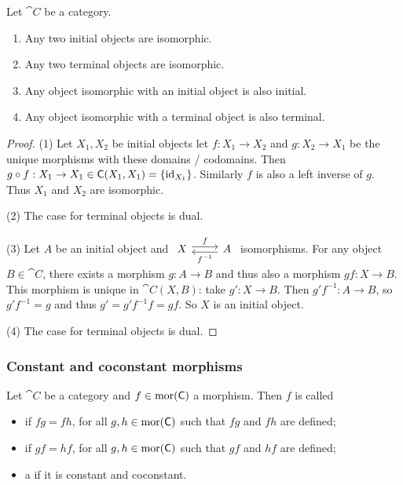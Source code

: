 \begin{proposition} \label{initialTerminalIsomorphisms}
Let $\cat{C}$ be a category.
\begin{enumerate}
\item Any two initial objects are isomorphic.
\item Any two terminal objects are isomorphic.
\item Any object isomorphic with an initial object is also initial.
\item Any object isomorphic with a terminal object is also terminal.
\end{enumerate}
\end{proposition}
\begin{proof}
(1) Let $X_1,X_2$ be initial objects let $f:X_1\to X_2$ and $g:X_2\to X_1$ be the unique morphisms with these domains / codomains. Then $g\circ f: X_1 \to X_1 \in \mathsf{C}(X_1, X_1) = \{\operatorname{id}_{X_1}\}$. Similarly $f$ is also a left inverse of $g$. Thus $X_1$ and $X_2$ are isomorphic.

(2) The case for terminal objects is dual.

(3) Let $A$ be an initial object and $\begin{tikzcd}
X \arrow[r, shift left, "f"] & \arrow[l, shift left, "f^{-1}"] A
\end{tikzcd}$ isomorphisms. For any object $B\in \cat{C}$, there exists a morphism $g: A\to B$ and thus also a morphism $gf: X\to B$. This morphism is unique in $\cat{C}(X, B)$: take $g': X\to B$. Then $g'f^{-1}: A\to B$, so $g'f^{-1} = g$ and thus $g' = g'f^{-1}f = gf$. So $X$ is an initial object.

(4) The case for terminal objects is dual.
\end{proof}

\subsubsection{Constant and coconstant morphisms}
\begin{definition}
Let $\cat{C}$ be a category and $f\in\operatorname{mor}(\mathsf{C})$ a morphism. Then $f$ is called
\begin{itemize}
\item {} if $fg = fh$, for all $g,h\in\operatorname{mor}(\mathsf{C})$ such that $fg$ and $fh$ are defined;
\item {} if $gf = hf$, for all $g,h\in\operatorname{mor}(\mathsf{C})$ such that $gf$ and $hf$ are defined;
\item a  if it is constant and coconstant.
\end{itemize}
\end{definition}

